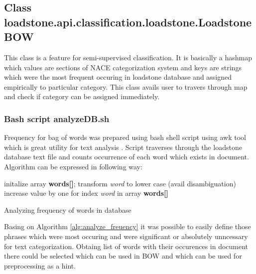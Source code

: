 \subsection{Class loadstone.api.classification.loadstone.LoadstoneBOW}
This class is a feature for semi-supervised classification. It is basically a hashmap which values are sections of NACE categorization system and keys are strings which were the most frequent occuring in loadstone database and assigned empirically to particular category. This class avails user to travers through map and check if category can be assigned immediately. 
\subsubsection{Bash script analyzeDB.sh}
Frequency for bag of words was prepared using bash shell script using awk tool which is great utility for text analysis \cite{21}. Script traverses through the loadstone database text file and counts occurrence of each word which exists in document. Algorithm can be expressed in following way:
\begin{algorithm}[h]
	initalize array \textbf{words[]};
	\newline
	{
		transform \textit{word} to lower case (avail disambiguation)
		\newline
		increase value by one for index \textit{word} in array \textbf{words[]} 
	}
\caption{Analyzing frequency of words in database}\label{alg:analyze_freuency}
\end{algorithm}

Basing on Algorithm \ref{alg:analyze_freuency} it was possible to easily define those phrases which were most occuring and were significant or absolutely unncessary for text categorization. Obtaing list of words with their occurences in document there could be selected which can be used in BOW and which can be used for preprocessing as a hint.


 
